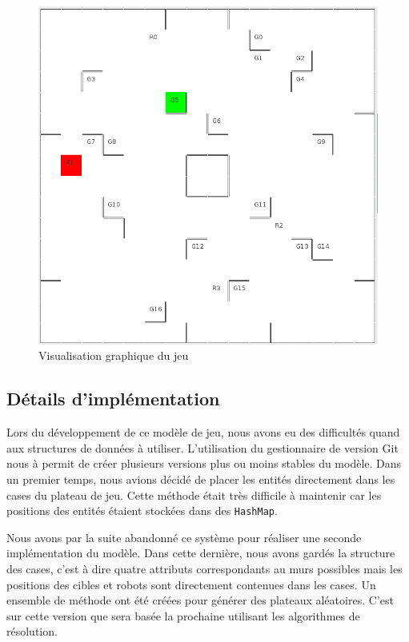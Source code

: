 \documentclass[a4paper]{article} %
\begin{document}
\begin{figure}[htpb]
	\begin{center}
	\includegraphics[scale=0.4]{./images/visuBoard.png}
	\caption{Visualisation graphique du jeu}\label{visuBoard}
	\end{center}
\end{figure}

	\subsection{Détails d'implémentation}
Lors du développement de ce modèle de jeu, nous avons eu des difficultés quand aux structures de données à utiliser. L'utilisation du gestionnaire de version Git nous à permit de créer plusieurs versions plus ou moins stables du modèle. Dans un premier temps, nous avions décidé de placer les entités directement dans les cases du plateau de jeu. Cette méthode était très difficile à maintenir car les positions des entités étaient stockées dans des \texttt{HashMap}.

Nous avons par la suite abandonné ce système pour réaliser une seconde implémentation du modèle. Dans cette dernière, nous avons gardés la structure des cases, c'est à dire quatre attributs correspondants au murs possibles mais les positions des cibles et robots sont directement contenues dans les cases. Un ensemble de méthode ont été créées pour générer des plateaux aléatoires. C'est sur cette version que sera basée la prochaine utilisant les algorithmes de résolution.
\end{document}
